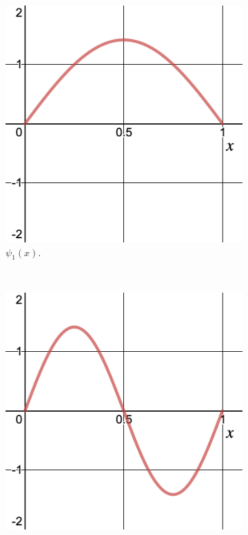         \begin{figure}[H]
    \centering
    \begin{subfigure}[h]{0.3\textwidth}
        \includegraphics[width=\textwidth]{Figures_Part_2/state_1.png}
        \caption{$\psi_1(x)$.}
    \end{subfigure}
    ~ 
    \begin{subfigure}[h]{0.3\textwidth}
        \includegraphics[width=\textwidth]{Figures_Part_2/state_2.png}

\end{subfigure}
\end{figure}
